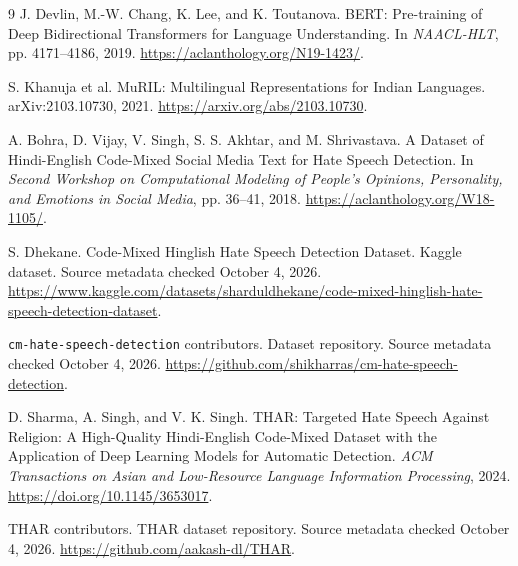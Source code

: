 \documentclass[11pt,a4paper]{article}
\begin{document}
\begin{thebibliography}{9}
J. Devlin, M.-W. Chang, K. Lee, and K. Toutanova.
BERT: Pre-training of Deep Bidirectional Transformers for Language
Understanding. In \emph{NAACL-HLT}, pp. 4171--4186, 2019.
\url{https://aclanthology.org/N19-1423/}.

S. Khanuja et al. MuRIL: Multilingual Representations for Indian
Languages. arXiv:2103.10730, 2021.
\url{https://arxiv.org/abs/2103.10730}.

A. Bohra, D. Vijay, V. Singh, S. S. Akhtar, and M. Shrivastava.
A Dataset of Hindi-English Code-Mixed Social Media Text for Hate Speech
Detection. In \emph{Second Workshop on Computational Modeling of People's
Opinions, Personality, and Emotions in Social Media}, pp. 36--41, 2018.
\url{https://aclanthology.org/W18-1105/}.

S. Dhekane. Code-Mixed Hinglish Hate Speech Detection Dataset.
Kaggle dataset. Source metadata checked October 4, 2026.
\url{https://www.kaggle.com/datasets/sharduldhekane/code-mixed-hinglish-hate-speech-detection-dataset}.

\texttt{cm-hate-speech-detection} contributors. Dataset repository.
Source metadata checked October 4, 2026.
\url{https://github.com/shikharras/cm-hate-speech-detection}.

D. Sharma, A. Singh, and V. K. Singh. THAR: Targeted Hate Speech Against
Religion: A High-Quality Hindi-English Code-Mixed Dataset with the
Application of Deep Learning Models for Automatic Detection.
\emph{ACM Transactions on Asian and Low-Resource Language Information
Processing}, 2024. \url{https://doi.org/10.1145/3653017}.

THAR contributors. THAR dataset repository.
Source metadata checked October 4, 2026.
\url{https://github.com/aakash-dl/THAR}.
\end{thebibliography}
\end{document}
